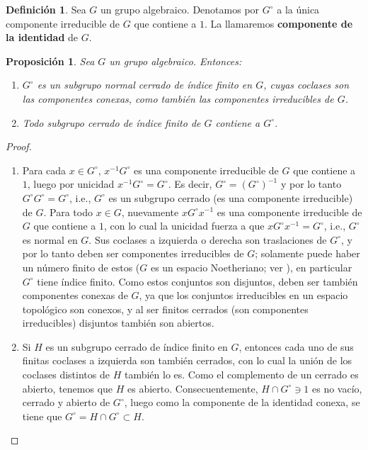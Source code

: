 \documentclass[spanish,12pt]{amsart}
\newtheorem{proposition}[theorem]{Proposición}
\theoremstyle{definition}
\newtheorem{definition}[theorem]{Definición}
\theoremstyle{remark}
\numberwithin{equation}{section}
\begin{document}
\begin{definition}
Sea $G$ un grupo algebraico. Denotamos por $G^\circ$ a la única componente irreducible de $G$ que contiene a $1$. La llamaremos \textbf{componente de la identidad} de $G$.
\end{definition}

\begin{proposition}\label{proposicion:componente de la identidad}
Sea $G$ un grupo algebraico. Entonces:
\begin{enumerate}[(1)]
\item $G^\circ$ es un subgrupo normal cerrado de índice finito en $G$, cuyas coclases son las componentes conexas, como también las componentes irreducibles de $G$.
\item Todo subgrupo cerrado de índice finito de $G$ contiene a $G^\circ$.
\end{enumerate}
\end{proposition}
\begin{proof}
\begin{enumerate}[(1)]
\item Para cada $x \in G^\circ$, $x^{-1} G^\circ$ es una componente irreducible de $G$ que contiene a $1$, luego por unicidad $x^{-1} G^\circ = G^{\circ}$. Es decir, $G^\circ = (G^{\circ})^{-1}$ y por lo tanto $G^\circ G^\circ = G ^\circ$, i.e., $G^\circ$ es un subgrupo cerrado (es una componente irreducible) de $G$. Para todo $x \in G$, nuevamente $x G^{\circ} x^{-1}$ es una componente irreducible de $G$ que contiene a $1$, con lo cual la unicidad fuerza a que $x G^\circ x^{-1} = G^{\circ}$, i.e., $G^\circ$ es normal en $G$. Sus coclases a izquierda o derecha son traslaciones de $G^\circ$, y por lo tanto deben ser componentes irreducibles de $G$; solamente puede haber un número finito de estos ($G$ es un espacio Noetheriano; ver \cite[Teorema 2.8.9]{notas_pedro}), en particular $G^\circ$ tiene índice finito. Como estos conjuntos son disjuntos, deben ser también componentes conexas de $G$, ya que los conjuntos irreducibles en un espacio topológico son conexos, y al ser finitos cerrados (son componentes irreducibles) disjuntos también son abiertos.
\item Si $H$ es un subgrupo cerrado de índice finito en $G$, entonces cada uno de sus finitas coclases a izquierda son también cerrados, con lo cual la unión de los coclases distintos de $H$ también lo es. Como el complemento de un cerrado es abierto, tenemos que $H$ es abierto. Consecuentemente, $H \cap G^\circ \ni 1$ es no vacío, cerrado y abierto de $G^\circ$, luego como la componente de la identidad conexa, se tiene que $G^\circ = H \cap G^\circ \subset H$.
\end{enumerate}
\end{proof}
\end{document}
